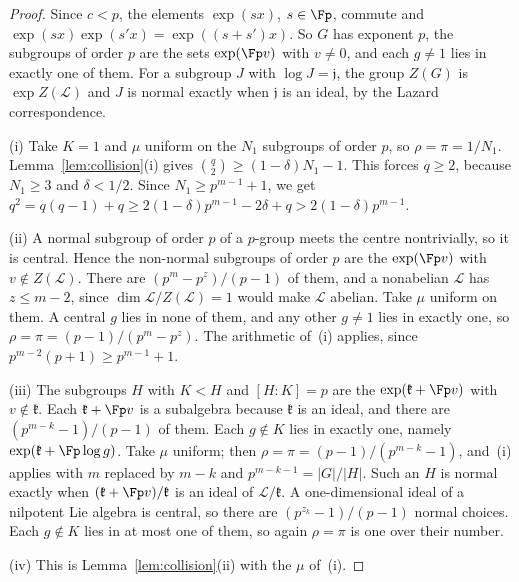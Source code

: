 \begin{proof}
Since $c<p$, the elements $\exp(sx)$, $s\in\Fp$, commute and $\exp(sx)\exp(s'x) = \exp((s+s')x)$. So $G$ has exponent $p$, the subgroups of order $p$ are the sets $\exp(\Fp v)$ with $v \ne 0$, and each $g \ne 1$ lies in exactly one of them. For a subgroup $J$ with $\log J = \mathfrak{j}$, the group $Z(G)$ is $\exp Z(\mathcal{L})$ and $J$ is normal exactly when $\mathfrak{j}$ is an ideal, by the Lazard correspondence.

(i) Take $K = 1$ and $\mu$ uniform on the $N_1$ subgroups of order $p$, so $\rho = \pi = 1/N_1$. Lemma~\ref{lem:collision}(i) gives $\binom q2 \ge (1-\delta)N_1 - 1$. This forces $q \ge 2$, because $N_1 \ge 3$ and $\delta < 1/2$. Since $N_1 \ge p^{m-1}+1$, we get $q^2 = q(q-1) + q \ge 2(1-\delta)p^{m-1} - 2\delta + q > 2(1-\delta)p^{m-1}$.

(ii) A normal subgroup of order $p$ of a $p$-group meets the centre nontrivially, so it is central. Hence the non-normal subgroups of order $p$ are the $\exp(\Fp v)$ with $v \notin Z(\mathcal{L})$. There are $(p^m-p^z)/(p-1)$ of them, and a nonabelian $\mathcal{L}$ has $z \le m-2$, since $\dim \mathcal{L}/Z(\mathcal{L}) = 1$ would make $\mathcal{L}$ abelian. Take $\mu$ uniform on them. A central $g$ lies in none of them, and any other $g\neq 1$ lies in exactly one, so $\rho = \pi = (p-1)/(p^m-p^z)$. The arithmetic of~(i) applies, since $p^{m-2}(p+1) \ge p^{m-1}+1$.

(iii) The subgroups $H$ with $K<H$ and $[H:K]=p$ are the $\exp(\mathfrak{k}+\Fp v)$ with $v\notin\mathfrak{k}$. Each $\mathfrak{k}+\Fp v$ is a subalgebra because $\mathfrak{k}$ is an ideal, and there are $(p^{m-k}-1)/(p-1)$ of them. Each $g \notin K$ lies in exactly one, namely $\exp(\mathfrak{k} + \Fp\log g)$. Take $\mu$ uniform; then $\rho=\pi=(p-1)/(p^{m-k}-1)$, and~(i) applies with $m$ replaced by $m-k$ and $p^{m-k-1} = |G|/|H|$. Such an $H$ is normal exactly when $(\mathfrak{k}+\Fp v)/\mathfrak{k}$ is an ideal of $\mathcal{L}/\mathfrak{k}$. A one-dimensional ideal of a nilpotent Lie algebra is central, so there are $(p^{z_k}-1)/(p-1)$ normal choices. Each $g\notin K$ lies in at most one of them, so again $\rho=\pi$ is one over their number.

(iv) This is Lemma~\ref{lem:collision}(ii) with the $\mu$ of~(i).


\end{proof}
